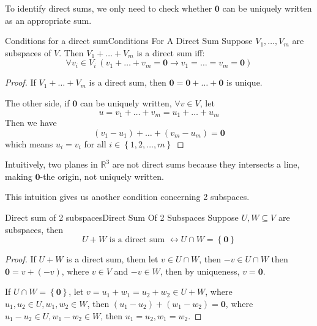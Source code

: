 \documentclass[../main.tex]{subfiles}
\begin{document}
To identify direct sums, we only need to check whether $\boldsymbol{0}$ can be uniquely written as an appropriate sum.
\begin{theorem}{Conditions for a direct sum}{Conditions For A Direct Sum}
Suppose $V_1, \ldots ,V_m$ are subspaces of $V$. Then $V_1+\ldots +V_m$ is a direct sum iff:
\begin{equation}
\forall v_i \in V_i\ (v_1+\ldots +v_m=\boldsymbol{0} \rightarrow v_1=\ldots =v_m=\boldsymbol{0})
\end{equation}
\end{theorem}
\begin{proof}
If $V_1+\ldots +V_m$ is a direct sum, then $\boldsymbol{0}=\boldsymbol{0}+\ldots +\boldsymbol{0}$ is unique.

The other side, if $\boldsymbol{0}$ can be uniquely written, $\forall v \in V$, let
\begin{equation*}
u=v_1+\ldots +v_m=u_1+\ldots +u_m
\end{equation*}
Then we have
\begin{equation*}
(v_1-u_1)+\ldots +(v_m-u_m)=\boldsymbol{0}
\end{equation*}
which means $u_i=v_i$ for all $i \in \left\{ 1,2, \ldots ,m \right\}$
\end{proof}

\begin{remark}
Intuitively, two planes in $\mathbb{R}^3$ are not direct sums because they intersects a line, making $\boldsymbol{0}$-the origin, not uniquely written.

This intuition gives us another condition concerning 2 subspaces.
\end{remark}
\begin{theorem}{Direct sum of 2 subspaces}{Direct Sum Of 2 Subspaces}
Suppose $U,W \subseteq V$ are subspaces, then
\begin{equation}
U+W \text{ is a direct sum } \leftrightarrow U\cap W = \left\{ \boldsymbol{0} \right\}
\end{equation}
\end{theorem}
\begin{proof}
If $U+W$ is a direct sum, them let $v \in U\cap W$, then $-v \in U\cap W$ then $\boldsymbol{0} = v+(-v)$, where $v \in V$ and $-v \in W$, then by uniqueness, $v=\boldsymbol{0}$.

If $U\cap W=\left\{ \boldsymbol{0} \right\}$, let $v = u_1+w_1=u_2+w_2 \in U+W$, where $u_1,u_2 \in U,w_1,w_2 \in W$, then $(u_1-u_2)+(w_1-w_2)= \boldsymbol{0}$, where $u_1-u_2 \in U,w_1-w_2 \in W$, then $u_1=u_2,w_1=w_2$.
\end{proof}
\end{document}
